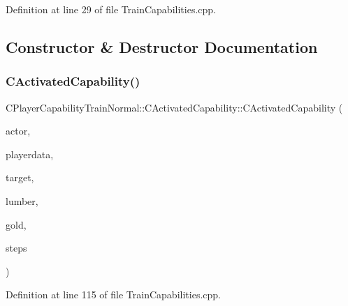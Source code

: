 Definition at line 29 of file Train\+Capabilities.\+cpp.



\subsection{Constructor \& Destructor Documentation}
\hypertarget{classCPlayerCapabilityTrainNormal_1_1CActivatedCapability_a6d160dbc57c968390a91f0797cc53306}{}\label{classCPlayerCapabilityTrainNormal_1_1CActivatedCapability_a6d160dbc57c968390a91f0797cc53306} 
\subsubsection{\texorpdfstring{C\+Activated\+Capability()}{CActivatedCapability()}}
{\footnotesize\ttfamily C\+Player\+Capability\+Train\+Normal\+::\+C\+Activated\+Capability\+::\+C\+Activated\+Capability (\begin{DoxyParamCaption}\item[{std\+::shared\+\_\+ptr$<$ \hyperlink{classCPlayerAsset}{C\+Player\+Asset} $>$}]{actor,  }\item[{std\+::shared\+\_\+ptr$<$ \hyperlink{classCPlayerData}{C\+Player\+Data} $>$}]{playerdata,  }\item[{std\+::shared\+\_\+ptr$<$ \hyperlink{classCPlayerAsset}{C\+Player\+Asset} $>$}]{target,  }\item[{int}]{lumber,  }\item[{int}]{gold,  }\item[{int}]{steps }\end{DoxyParamCaption})}



Definition at line 115 of file Train\+Capabilities.\+cpp.



